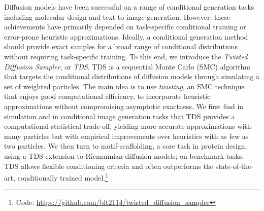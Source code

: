 Diffusion models have been successful on a range of conditional generation tasks including molecular design and text-to-image generation.
However, these achievements have primarily depended on task-specific conditional training or error-prone heuristic approximations.
Ideally, a conditional generation method should provide exact samples for a broad range of conditional distributions without requiring task-specific training.
To this end, we introduce the \emph{Twisted Diffusion Sampler}, or \emph{TDS}.
TDS is a sequential Monte Carlo (SMC) algorithm that targets the conditional distributions of diffusion models through simulating a set of weighted particles. 
The main idea is to use \emph{twisting}, an SMC technique that enjoys good computational efficiency, to incorporate heuristic approximations without compromising asymptotic exactness. 
We first find in simulation and in conditional image generation tasks that TDS provides a computational statistical trade-off, yielding more accurate approximations with many particles but with empirical improvements over heuristics with as few as two particles.
We then turn to motif-scaffolding, a core task in protein design, using a TDS extension to Riemannian diffusion models; on benchmark tasks, TDS allows flexible conditioning criteria and often outperforms the state-of-the-art, conditionally trained model.\footnote{
 Code: \url{https://github.com/blt2114/twisted_diffusion_sampler}
 }


